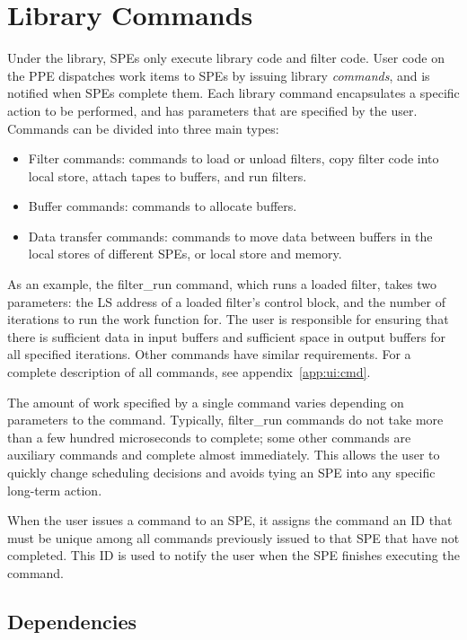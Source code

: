 \section{Library Commands}

Under the library, SPEs only execute library code and filter code. User code on the PPE dispatches work items to SPEs by issuing library \emph{commands}, and is notified when SPEs complete them. Each library command encapsulates a specific action to be performed, and has parameters that are specified by the user. Commands can be divided into three main types:
\begin{itemize}
\item Filter commands: commands to load or unload filters, copy filter code into local store, attach tapes to buffers, and run filters.
\item Buffer commands: commands to allocate buffers.
\item Data transfer commands: commands to move data between buffers in the local stores of different SPEs, or local store and memory.
\end{itemize}

As an example, the \textsf{filter\_run} command, which runs a loaded filter, takes two parameters: the LS address of a loaded filter's control block, and the number of iterations to run the work function for. The user is responsible for ensuring that there is sufficient data in input buffers and sufficient space in output buffers for all specified iterations. Other commands have similar requirements. For a complete description of all commands, see appendix~\ref{app:ui:cmd}.

The amount of work specified by a single command varies depending on parameters to the command. Typically, \textsf{filter\_run} commands do not take more than a few hundred microseconds to complete; some other commands are auxiliary commands and complete almost immediately. This allows the user to quickly change scheduling decisions and avoids tying an SPE into any specific long-term action.

When the user issues a command to an SPE, it assigns the command an ID that must be unique among all commands previously issued to that SPE that have not completed. This ID is used to notify the user when the SPE finishes executing the command. 

\subsection{Dependencies}

